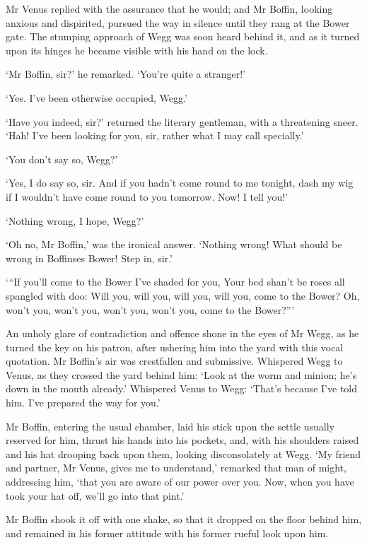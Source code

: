 Mr Venus replied with the assurance that he would; and Mr Boffin,
looking anxious and dispirited, pursued the way in silence until they
rang at the Bower gate. The stumping approach of Wegg was soon heard
behind it, and as it turned upon its hinges he became visible with his
hand on the lock.

‘Mr Boffin, sir?’ he remarked. ‘You’re quite a stranger!’

‘Yes. I’ve been otherwise occupied, Wegg.’

‘Have you indeed, sir?’ returned the literary gentleman, with a
threatening sneer. ‘Hah! I’ve been looking for you, sir, rather what I
may call specially.’

‘You don’t say so, Wegg?’

‘Yes, I do say so, sir. And if you hadn’t come round to me tonight, dash
my wig if I wouldn’t have come round to you tomorrow. Now! I tell you!’

‘Nothing wrong, I hope, Wegg?’

‘Oh no, Mr Boffin,’ was the ironical answer. ‘Nothing wrong! What should
be wrong in Boffinses Bower! Step in, sir.’

     ‘“If you’ll come to the Bower I’ve shaded for you,
     Your bed shan’t be roses all spangled with doo:
     Will you, will you, will you, will you, come to the Bower?
     Oh, won’t you, won’t you, won’t you, won’t you, come to the
          Bower?”’

An unholy glare of contradiction and offence shone in the eyes of Mr
Wegg, as he turned the key on his patron, after ushering him into the
yard with this vocal quotation. Mr Boffin’s air was crestfallen and
submissive. Whispered Wegg to Venus, as they crossed the yard behind
him: ‘Look at the worm and minion; he’s down in the mouth already.’
Whispered Venus to Wegg: ‘That’s because I’ve told him. I’ve prepared
the way for you.’

Mr Boffin, entering the usual chamber, laid his stick upon the settle
usually reserved for him, thrust his hands into his pockets, and,
with his shoulders raised and his hat drooping back upon them, looking
disconsolately at Wegg. ‘My friend and partner, Mr Venus, gives me to
understand,’ remarked that man of might, addressing him, ‘that you are
aware of our power over you. Now, when you have took your hat off, we’ll
go into that pint.’

Mr Boffin shook it off with one shake, so that it dropped on the floor
behind him, and remained in his former attitude with his former rueful
look upon him.

